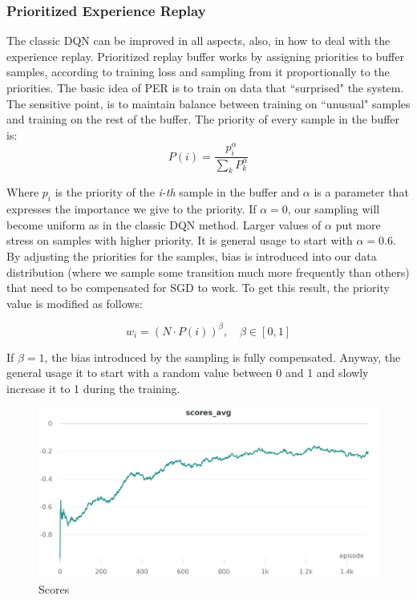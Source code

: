 \documentclass[12pt]{article}
\begin{document}
\subsubsection{Prioritized Experience Replay}
The classic DQN can be improved in all aspects, also, in how to deal with the experience replay.
Prioritized replay buffer \cite{per} works by assigning priorities to buffer samples, according to training loss and sampling from it proportionally to the priorities. The basic idea of PER is to train on data that ``surprised" the system. The sensitive point, is to maintain balance between training on ``unusual" samples and training on the rest of the buffer.
The priority of every sample in the buffer is:
\[ P(i)= \frac{p^\alpha _i}{\sum_k P^\alpha _k} \]

Where $p_i$ is the priority of the \textit{i-th} sample in the buffer and $\alpha$ is a parameter that expresses the importance we give to the priority. If $\alpha=0$, our sampling will become uniform as in the classic DQN method. Larger values of $\alpha$ put more stress on samples with higher priority. It is general usage to start with $\alpha=0.6$.  
By adjusting the priorities for the samples, bias is introduced into our data distribution (where we sample some transition much more frequently than others) that need to be compensated for SGD to work. To get this result, the priority value is modified as follows:

\[w_i=(N \cdot  P(i))^\beta ,\quad \beta \in [0,1]\]

If $\beta = 1$, the bias introduced by the sampling is fully compensated. Anyway, the general usage it to start with a random value between 0 and 1 and slowly increase it to 1 during the training.


\begin{figure}[H]
        \centerline{\includegraphics[scale=.2]{res/charts/per_scores.png}}
        \caption{Scores}
\end{figure}
\end{document}
